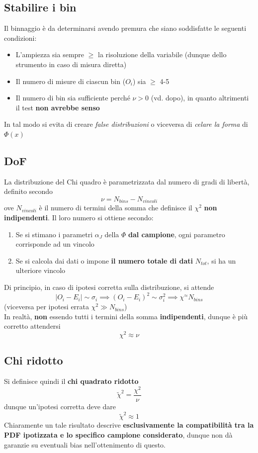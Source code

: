 \documentclass[10pt, oneside]{book}
\begin{document}
\subsection{Stabilire i bin}
Il binnaggio è da determinarsi avendo premura che siano soddisfatte le seguenti condizioni:
\begin{itemize}
\item L'ampiezza sia sempre $\geq$ la risoluzione della variabile (dunque dello strumento in caso di misura diretta)
\item Il numero di misure di ciascun bin ($O_i$) sia $\geq$ 4-5
\item Il numero di bin sia sufficiente perché $\nu > 0$ (vd. dopo), in quanto altrimenti il test \textbf{non avrebbe senso}
\end{itemize}
In tal modo si evita di creare \textit{false distribuzioni} o viceversa di \textit{celare la forma} di $\Phi(x)$

\subsection{DoF}
La distribuzione del Chi quadro è parametrizzata dal numero di gradi di libertà, definito secondo
\[\nu = N_{bins} - N_{vincoli}\]
ove $N_{vincoli}$ è il numero di termini della somma che definisce il $\chi^2$ \textbf{non indipendenti}. Il loro numero si ottiene secondo:
\begin{enumerate}
\item Se si stimano i parametri $\alpha_J$ della $\Phi$ \textbf{dal campione}, ogni parametro corrisponde ad un vincolo
\item Se si calcola dai dati o impone \textbf{il numero totale di dati} $N_{tot}$, si ha un ulteriore vincolo
\end{enumerate}
Di principio, in caso di ipotesi corretta sulla distribuzione, si attende
\[|O_i - E_i| \sim \sigma_i \implies (O_i - E_i)^2 \sim \sigma_i^2 \implies
\chi^ \approx N_{bins}\]
(viceversa per ipotesi errata $\chi^2 \gg N_{bins}$)\\
In realtà, \textbf{non }essendo tutti i termini della somma \textbf{indipendenti}, dunque è più corretto attendersi
\[\chi^2 \approx \nu\]

\subsection{Chi ridotto}
Si definisce quindi il \textbf{chi quadrato ridotto}
\[\tilde{\chi}^2 = \frac{\chi^2}{\nu}\]
dunque un'ipotesi corretta deve dare
\[\tilde{\chi}^2 \approx 1\]
Chiaramente un tale risultato descrive \textbf{esclusivamente la compatibilità tra la PDF ipotizzata e lo specifico campione considerato}, dunque non dà garanzie su eventuali bias nell'ottenimento di questo.
\end{document}
